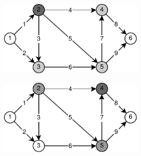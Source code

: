 \begin{figure}[!htbp]
	\centering
	\null\hfill
	\begin{subfigure}[b]{0.32\textwidth}
		\begin{subfigure}[b]{\textwidth}
			\includegraphics[width=\textwidth]{Chapter_I/FORWARD-REVERSE-STAR-Example/a.pdf}
			\caption{}
			\label{fig:forwardReverseStarRepresentation:a}
		\end{subfigure}
		\vfill
		\begin{subfigure}[b]{\textwidth}
			\includegraphics[width=\textwidth]{Chapter_I/FORWARD-REVERSE-STAR-Example/b.pdf}
			\caption{}
			\label{fig:forwardReverseStarRepresentation:b}
		\end{subfigure}
	\end{subfigure}
	\hfill
	\begin{subfigure}[b]{0.136\textwidth}

\end{subfigure}
\end{figure}
